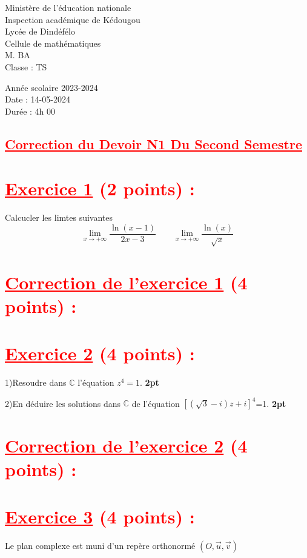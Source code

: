 \documentclass[12pt]{article}
\begin{document}
\begin{minipage}{0.5\textwidth}
	Ministère de l'éducation nationale  \\
	Inspection académique de Kédougou   \\
	Lycée de Dindéfélo            \\
	Cellule de mathématiques            \\
	M. BA                          \\
	Classe : TS  \\
\end{minipage}
\begin{minipage}{0.5\textwidth}
	Année scolaire 2023-2024 \\
	Date : 14-05-2024 \\
	Durée : 4h 00 \\
\end{minipage}

\begin{center}
	\section*{\textcolor{red}{\underline{Correction du Devoir N1 Du Second Semestre}}}
\end{center}
\section*{\textcolor{red}{\underline{Exercice 1} (2 points) :}}
Calcucler les limtes suivantes
\[\lim_{x \to +\infty}\frac{\ln(x-1)}{2x-3}\quad\quad\lim_{x \to +\infty}\frac{\ln(x)}{\sqrt{x}}\]
\section*{\textcolor{red}{\underline{Correction de l'exercice 1} (4 points) :}}
\section*{\textcolor{red}{\underline{Exercice 2} (4 points) :}}
1)Resoudre dans $\mathbb{C}$ l'équation $z^{4}=1$. \textbf{2pt}

2)En déduire les solutions dans $\mathbb{C}$ de l'équation $\left[\left(\sqrt{3}-i\right)z+i  \right]^{4}$=1. \textbf{2pt}
\section*{\textcolor{red}{\underline{Correction de l'exercice 2} (4 points) :}}
\section*{\textcolor{red}{\underline{Exercice 3} (4 points) :}}
Le plan complexe est muni d’un repère orthonormé $(O,\vec{u},\vec{v})$
\end{document}

